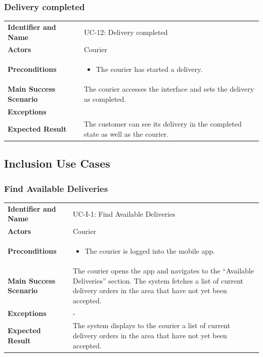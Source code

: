 \subsubsection{Delivery completed}

\noindent
\begin{tabularx}{\textwidth}{l X}
    \textbf{Identifier and Name} & UC-12: Delivery completed \\
    \textbf{Actors} & Courier \\
    \textbf{Preconditions} & 
    \begin{itemize} 
        \item The courier has started a delivery.
    \end{itemize} \\
    \textbf{Main Success Scenario} & The courier accesses the interface and sets the delivery as completed. \\
    \textbf{Exceptions} & \\
    \textbf{Expected Result} & The customer can see its delivery in the completed state as well as the courier.
\end{tabularx}


\subsection{Inclusion Use Cases}

\subsubsection{Find Available Deliveries}

\noindent
\begin{tabularx}{\textwidth}{l X}
    \textbf{Identifier and Name} & UC-I-1: Find Available Deliveries \\
    \textbf{Actors} & Courier \\
    \textbf{Preconditions} & 
    \begin{itemize} 
        \item The courier is logged into the mobile app.
    \end{itemize} \\
    \textbf{Main Success Scenario} & The courier opens the app and navigates to the “Available Deliveries” section. The system fetches a list of current delivery orders in the area that have not yet been accepted. \\
    \textbf{Exceptions} & 
     - \\
    \textbf{Expected Result} & The system displays to the courier a list of current delivery orders in the area that have not yet been accepted.
\end{tabularx}